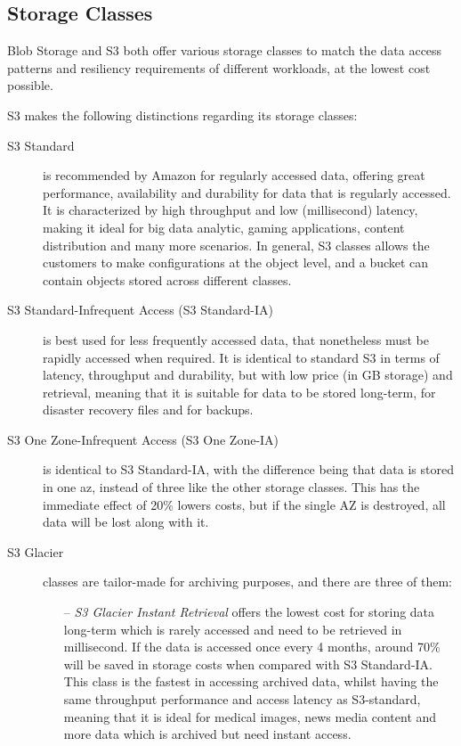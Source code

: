 \subsection{Storage Classes}
Blob Storage and S3 both offer various storage classes to match the data access patterns and resiliency requirements of different workloads, at the lowest cost possible.

S3 makes the following distinctions regarding its storage classes: ~\cite{s3faq}
\begin{description}
    \item[S3 Standard] is recommended by Amazon for regularly accessed data, offering great performance, availability and durability for data that is regularly accessed. It is characterized by high throughput and low (millisecond) latency, making it ideal for big data analytic, gaming applications, content distribution and many more scenarios. In general, S3 classes allows the customers to make configurations at the object level, and a bucket can contain objects stored across different classes.

    \item [S3 Standard-Infrequent Access (S3 Standard-IA)] is best used for less frequently accessed data, that nonetheless must be rapidly accessed when required. It is identical to standard S3 in terms of latency, throughput and durability, but with low price (in GB storage) and retrieval, meaning that it is suitable for data to be stored long-term, for disaster recovery files and for backups.

    \item[S3 One Zone-Infrequent Access (S3 One Zone-IA)] is identical to S3 Standard-IA, with the difference being that data is stored in one \ac{az}, instead of three like the other storage classes. This has the immediate effect of 20\% lowers costs, but if the single AZ is destroyed, all data will be lost along with it.

    \item[S3 Glacier] classes are tailor-made for archiving purposes, and there are three of them:
    \begin{itemize}
        \item [--] \textit{S3 Glacier Instant Retrieval} offers the lowest cost for storing data long-term which is rarely accessed and need to be retrieved in millisecond. If the data is accessed once every 4 months, around 70\% will be saved in storage costs when compared with S3 Standard-IA. This class is the fastest in accessing archived data, whilst having the same throughput performance and access latency as S3-standard, meaning that it is ideal for medical images, news media content and more data which is archived but need instant access.


\end{itemize}
\end{description}
